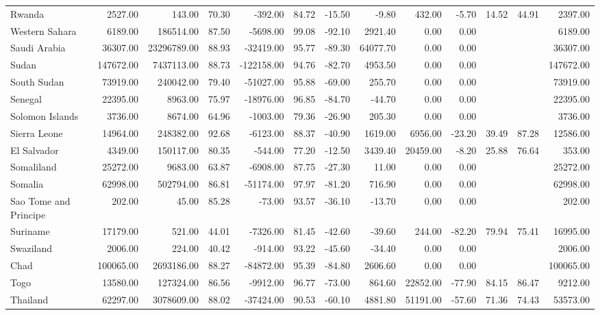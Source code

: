 \begin{table}[ht]
\begin{tabular}{lrrrrrrrrrrrr}
  Rwanda & 2527.00 & 143.00 & 70.30 & -392.00 & 84.72 & -15.50 & -9.80 & 432.00 & -5.70 & 14.52 & 44.91 & 2397.00 \\ 
  Western Sahara & 6189.00 & 186514.00 & 87.50 & -5698.00 & 99.08 & -92.10 & 2921.40 & 0.00 & 0.00 &  &  & 6189.00 \\ 
  Saudi Arabia & 36307.00 & 23296789.00 & 88.93 & -32419.00 & 95.77 & -89.30 & 64077.70 & 0.00 & 0.00 &  &  & 36307.00 \\ 
  Sudan & 147672.00 & 7437113.00 & 88.73 & -122158.00 & 94.76 & -82.70 & 4953.50 & 0.00 & 0.00 &  &  & 147672.00 \\ 
  South Sudan & 73919.00 & 240042.00 & 79.40 & -51027.00 & 95.88 & -69.00 & 255.70 & 0.00 & 0.00 &  &  & 73919.00 \\ 
  Senegal & 22395.00 & 8963.00 & 75.97 & -18976.00 & 96.85 & -84.70 & -44.70 & 0.00 & 0.00 &  &  & 22395.00 \\ 
  Solomon Islands & 3736.00 & 8674.00 & 64.96 & -1003.00 & 79.36 & -26.90 & 205.30 & 0.00 & 0.00 &  &  & 3736.00 \\ 
  Sierra Leone & 14964.00 & 248382.00 & 92.68 & -6123.00 & 88.37 & -40.90 & 1619.00 & 6956.00 & -23.20 & 39.49 & 87.28 & 12586.00 \\ 
  El Salvador & 4349.00 & 150117.00 & 80.35 & -544.00 & 77.20 & -12.50 & 3439.40 & 20459.00 & -8.20 & 25.88 & 76.64 & 353.00 \\ 
  Somaliland & 25272.00 & 9683.00 & 63.87 & -6908.00 & 87.75 & -27.30 & 11.00 & 0.00 & 0.00 &  &  & 25272.00 \\ 
  Somalia & 62998.00 & 502794.00 & 86.81 & -51174.00 & 97.97 & -81.20 & 716.90 & 0.00 & 0.00 &  &  & 62998.00 \\ 
  Sao Tome and Principe & 202.00 & 45.00 & 85.28 & -73.00 & 93.57 & -36.10 & -13.70 & 0.00 & 0.00 &  &  & 202.00 \\ 
  Suriname & 17179.00 & 521.00 & 44.01 & -7326.00 & 81.45 & -42.60 & -39.60 & 244.00 & -82.20 & 79.94 & 75.41 & 16995.00 \\ 
  Swaziland & 2006.00 & 224.00 & 40.42 & -914.00 & 93.22 & -45.60 & -34.40 & 0.00 & 0.00 &  &  & 2006.00 \\ 
  Chad & 100065.00 & 2693186.00 & 88.27 & -84872.00 & 95.39 & -84.80 & 2606.60 & 0.00 & 0.00 &  &  & 100065.00 \\ 
  Togo & 13580.00 & 127324.00 & 86.56 & -9912.00 & 96.77 & -73.00 & 864.60 & 22852.00 & -77.90 & 84.15 & 86.47 & 9212.00 \\ 
  Thailand & 62297.00 & 3078609.00 & 88.02 & -37424.00 & 90.53 & -60.10 & 4881.80 & 51191.00 & -57.60 & 71.36 & 74.43 & 53573.00 \\ 

\end{tabular}
\end{table}

